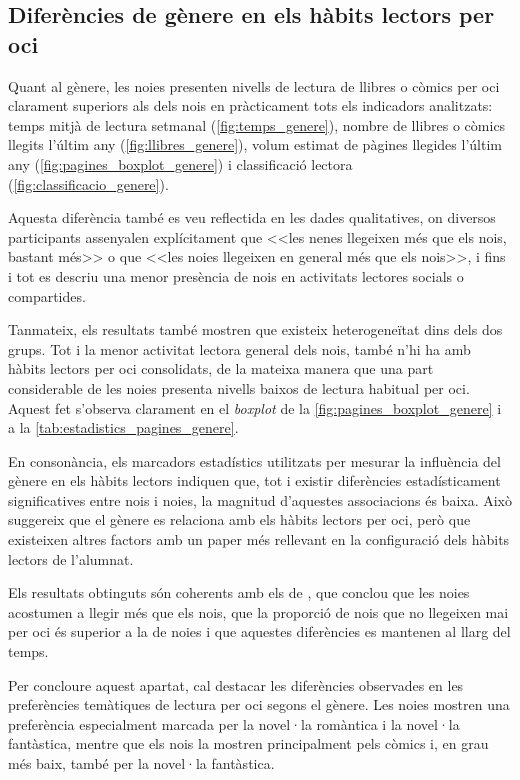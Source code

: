 \documentclass[12pt]{article}
\begin{document}
\subsection{Diferències de gènere en els hàbits lectors per oci}
Quant al gènere, les noies presenten nivells de lectura de llibres o còmics per oci clarament superiors als dels nois en pràcticament tots els indicadors analitzats: temps mitjà de lectura setmanal (\autoref{fig:temps_genere}), nombre de llibres o còmics llegits l'últim any (\autoref{fig:llibres_genere}), volum estimat de pàgines llegides l'últim any (\autoref{fig:pagines_boxplot_genere}) i classificació lectora (\autoref{fig:classificacio_genere}).

Aquesta diferència també es veu reflectida en les dades qualitatives, on diversos participants assenyalen explícitament que <<les nenes llegeixen més que els nois, bastant més>> o que <<les noies llegeixen en general més que els nois>>, i fins i tot es descriu una menor presència de nois en activitats lectores socials o compartides.

Tanmateix, els resultats també mostren que existeix heterogeneïtat dins dels dos grups. Tot i la menor activitat lectora general dels nois, també n'hi ha amb hàbits lectors per oci consolidats, de la mateixa manera que una part considerable de les noies presenta nivells baixos de lectura habitual per oci. Aquest fet s'observa clarament en el \emph{boxplot} de la \autoref{fig:pagines_boxplot_genere} i a la \autoref{tab:estadistics_pagines_genere}.

En consonància, els marcadors estadístics utilitzats per mesurar la influència del gènere en els hàbits lectors indiquen que, tot i existir diferències estadísticament significatives entre nois i noies, la magnitud d’aquestes associacions és baixa. Això suggereix que el gènere es relaciona amb els hàbits lectors per oci, però que existeixen altres factors amb un paper més rellevant en la configuració dels hàbits lectors de l’alumnat.  

Els resultats obtinguts són coherents amb els de \textcite{johnsson_bookreading}, que conclou que les noies acostumen a llegir més que els nois, que la proporció de nois que no llegeixen mai per oci és superior a la de noies i que aquestes diferències es mantenen al llarg del temps.

Per concloure aquest apartat, cal destacar les diferències observades en les preferències temàtiques de lectura per oci segons el gènere. Les noies mostren una preferència especialment marcada per la novel·la romàntica i la novel·la fantàstica, mentre que els nois la mostren principalment pels còmics i, en grau més baix, també per la novel·la fantàstica.
\end{document}
